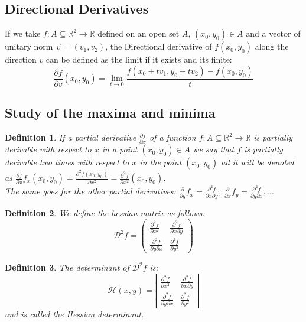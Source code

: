 \documentclass{article}
\newtheorem{definition}{Definition}
\begin{document}
    \subsection*{Directional Derivatives}
    If we take $f : A \subseteq \mathbb{R}^2 \rightarrow \mathbb{R}$ defined on an open set $A$, $(x_0,y_0) \in A$ and a vector of unitary norm $\vec{v} = (v_1,v_2)$, the Directional derivative of $f(x_0,y_0)$ along the direction $\bar{v}$ can be defined as the limit if it exists and its finite:
    \begin{equation*}
        \frac{\partial f}{\partial \bar{v}}(x_0,y_0) = \lim_{t \to 0} \frac{f(x_0 + tv_1, y_0 + tv_2) - f(x_0,y_0) }{t}
    \end{equation*}
    \subsection*{Study of the maxima and minima}
        \begin{definition}
            If a partial derivative $\frac{\partial f}{\partial x}$ of a function $f : A \subseteq \mathbb{R}^2 \rightarrow \mathbb{R}$ is partially derivable with respect to $x$ in a point $(x_0,y_0) \in A$ we say that $f$ is partially derivable two times with respect to $x$ in the point $(x_0,y_0)$ ad it will be denoted as $\frac{\partial f}{\partial x}f_x(x_0,y_0)=\frac{\partial^2 f(x_0,y_0)}{\partial x^2} = \frac{\partial^2 f}{\partial x^2}(x_0,y_0)$. \\
            The same goes for the other partial derivatives: $\frac{\partial}{\partial y}f_x = \frac{\partial^2 f}{\partial x \partial y}$, $\frac{\partial}{\partial x}f_y = \frac{\partial^2 f}{\partial y \partial x}, \ldots $            
        \end{definition}
        \begin{definition}
            We define the hessian matrix as follows:
        \begin{equation*}
            \mathcal{D}^2f = \left(\begin{matrix}
                \frac{\partial^2 f}{\partial x^2} & \frac{\partial ^2 f}{\partial x \partial y} \\ \frac{\partial^2 f}{\partial y \partial x} & \frac{\partial ^2 f}{\partial y^2} 
            \end{matrix} \right)  
        \end{equation*}
        \end{definition}
        \begin{definition}
            The determinant of $\mathcal{D}^2f$ is: 
            \begin{equation*}
                \mathcal{H}(x,y) = \left\lvert \begin{matrix}
                \frac{\partial^2 f}{\partial x^2} & \frac{\partial ^2 f}{\partial x \partial y} \\ \frac{\partial^2 f}{\partial y \partial x} & \frac{\partial ^2 f}{\partial y^2} 
            \end{matrix} \right\rvert 
        \end{equation*} and is called the Hessian determinant.
        \end{definition}
\end{document}
